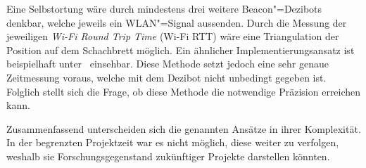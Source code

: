 Eine Selbstortung wäre durch mindestens drei weitere Beacon"=Dezibots denkbar, welche jeweils ein WLAN"=Signal aussenden. Durch die Messung der jeweiligen \emph{Wi-Fi Round Trip Time} (Wi-Fi RTT) wäre eine Triangulation der Position auf dem Schachbrett möglich. Ein ähnlicher Implementierungsansatz ist beispielhaft unter~\cite{espressifsystemsshanghaico.ltdFTMExample2024} einsehbar. Diese Methode setzt jedoch eine sehr genaue Zeitmessung voraus, welche mit dem Dezibot nicht unbedingt gegeben ist. Folglich stellt sich die Frage, ob diese Methode die notwendige Präzision erreichen kann.


Zusammenfassend unterscheiden sich die genannten Ansätze in ihrer Komplexität. In der begrenzten Projektzeit war es nicht möglich, diese weiter zu verfolgen, weshalb sie Forschungsgegenstand zukünftiger Projekte darstellen könnten.
